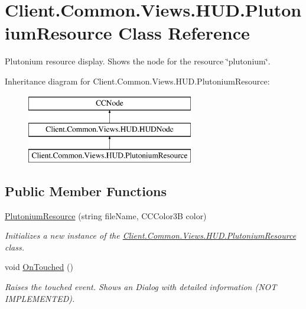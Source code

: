 \hypertarget{classClient_1_1Common_1_1Views_1_1HUD_1_1PlutoniumResource}{}\section{Client.\+Common.\+Views.\+H\+U\+D.\+Plutonium\+Resource Class Reference}
\label{classClient_1_1Common_1_1Views_1_1HUD_1_1PlutoniumResource}


Plutonium resource display. Shows the node for the resource \char`\"{}plutonium\char`\"{}.  


Inheritance diagram for Client.\+Common.\+Views.\+H\+U\+D.\+Plutonium\+Resource\+:\begin{figure}[H]
\begin{center}
\leavevmode
\includegraphics[height=3.000000cm]{classClient_1_1Common_1_1Views_1_1HUD_1_1PlutoniumResource}
\end{center}
\end{figure}
\subsection*{Public Member Functions}
\begin{DoxyCompactItemize}
\item 
\hyperlink{classClient_1_1Common_1_1Views_1_1HUD_1_1PlutoniumResource_afe78a9ecbfc0b97bbc0ae626c569175e}{Plutonium\+Resource} (string file\+Name, C\+C\+Color3\+B color)
\begin{DoxyCompactList}\small\item\em Initializes a new instance of the \hyperlink{classClient_1_1Common_1_1Views_1_1HUD_1_1PlutoniumResource}{Client.\+Common.\+Views.\+H\+U\+D.\+Plutonium\+Resource} class. \end{DoxyCompactList}\item 
void \hyperlink{classClient_1_1Common_1_1Views_1_1HUD_1_1PlutoniumResource_a5dd882a66aa1cab8a0e26d613f72e901}{On\+Touched} ()
\begin{DoxyCompactList}\small\item\em Raises the touched event. Shows an Dialog with detailed information (N\+O\+T I\+M\+P\+L\+E\+M\+E\+N\+T\+E\+D). \end{DoxyCompactList}\end{DoxyCompactItemize}
